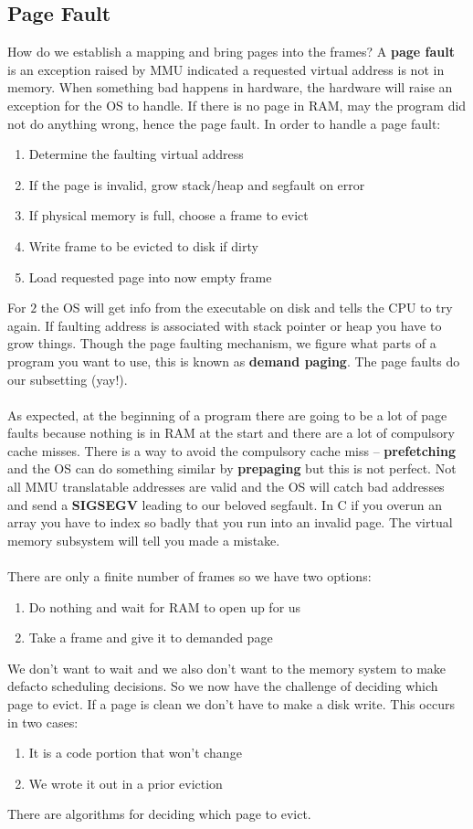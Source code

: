 \documentclass[../base_file/cs1550_notes.tex]{subfiles}
\begin{document}
\subsection{Page Fault}
How do we establish a mapping and bring pages into the frames?  A \textbf{page fault} is an exception raised by MMU indicated a requested
virtual address is not in memory.  When something bad happens in hardware, the hardware will raise an exception for the OS to handle.  If
there is no page in RAM, may the program did not do anything wrong, hence the page fault.  In order to handle a page fault:
\begin{enumerate}
	\item Determine the faulting virtual address
	\item If the page is invalid, grow stack/heap and segfault on error
	\item If physical memory is full, choose a frame to evict
	\item Write frame to be evicted to disk if dirty
   	\item Load requested page into now empty frame
\end{enumerate}
For $2$ the OS will get info from the executable on disk and tells the CPU to try again.  If faulting address is associated with stack
pointer or heap you have to grow things.  Though the page faulting mechanism, we figure what parts of a program you want to use, this
is known as \textbf{demand paging}.  The page faults do our subsetting (yay!).\\\\
As expected, at the beginning of a program there are going to be a lot of page faults because nothing is in RAM at the start and there
are a lot of compulsory cache misses.  There is a way to avoid the compulsory cache miss -- \textbf{prefetching} and the OS can do
something similar by \textbf{prepaging} but this is not perfect.  Not all MMU translatable addresses are valid and the OS will catch
bad addresses and send a \textbf{SIGSEGV} leading to our beloved segfault.  In C if you overun an array you have to index so badly that
you run into an invalid page.  The virtual memory subsystem will tell you made a mistake.\\\\
There are only a finite number of frames so we have two options:
\begin{enumerate}
	\item Do nothing and wait for RAM to open up for us
	\item Take a frame and give it to demanded page
\end{enumerate}
We don't want to wait and we also don't want to the memory system to make defacto scheduling decisions.  So we now have the challenge
of deciding which page to evict.  If a page is clean we don't have to make a disk write.  This occurs in two cases:
\begin{enumerate}
	\item It is a code portion that won't change
	\item We wrote it out in a prior eviction
\end{enumerate}
There are algorithms for deciding which page to evict.
\end{document}
